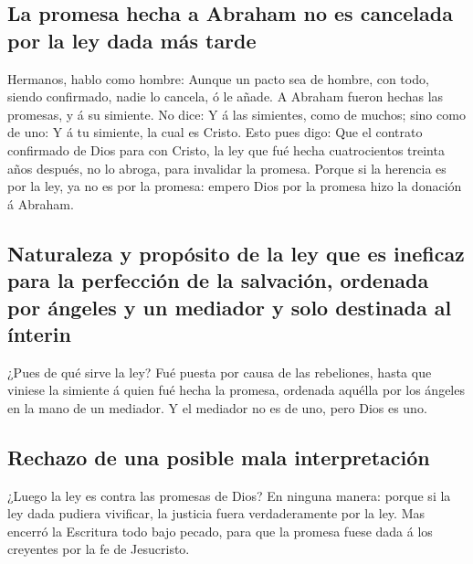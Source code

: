 \hypertarget{la-promesa-hecha-a-abraham-no-es-cancelada-por-la-ley-dada-muxe1s-tarde}{%
\subsection{La promesa hecha a Abraham no es cancelada por la ley dada
más
tarde}\label{la-promesa-hecha-a-abraham-no-es-cancelada-por-la-ley-dada-muxe1s-tarde}}

 Hermanos, hablo como hombre: Aunque un pacto sea de
hombre, con todo, siendo confirmado, nadie lo cancela, ó le añade.
 A Abraham fueron hechas las promesas, y á su simiente. No
dice: Y á las simientes, como de muchos; sino como de uno: Y á tu
simiente, la cual es Cristo.  Esto pues digo: Que el
contrato confirmado de Dios para con Cristo, la ley que fué hecha
cuatrocientos treinta años después, no lo abroga, para invalidar la
promesa.  Porque si la herencia es por la ley, ya no es por
la promesa: empero Dios por la promesa hizo la donación á Abraham.

\hypertarget{naturaleza-y-propuxf3sito-de-la-ley-que-es-ineficaz-para-la-perfecciuxf3n-de-la-salvaciuxf3n-ordenada-por-uxe1ngeles-y-un-mediador-y-solo-destinada-al-uxednterin}{%
\subsection{Naturaleza y propósito de la ley que es ineficaz para la
perfección de la salvación, ordenada por ángeles y un mediador y solo
destinada al
ínterin}\label{naturaleza-y-propuxf3sito-de-la-ley-que-es-ineficaz-para-la-perfecciuxf3n-de-la-salvaciuxf3n-ordenada-por-uxe1ngeles-y-un-mediador-y-solo-destinada-al-uxednterin}}

 ¿Pues de qué sirve la ley? Fué puesta por causa de las
rebeliones, hasta que viniese la simiente á quien fué hecha la promesa,
ordenada aquélla por los ángeles en la mano de un mediador.
 Y el mediador no es de uno, pero Dios es uno.

\hypertarget{rechazo-de-una-posible-mala-interpretaciuxf3n}{%
\subsection{Rechazo de una posible mala
interpretación}\label{rechazo-de-una-posible-mala-interpretaciuxf3n}}

 ¿Luego la ley es contra las promesas de Dios? En ninguna
manera: porque si la ley dada pudiera vivificar, la justicia fuera
verdaderamente por la ley.  Mas encerró la Escritura todo
bajo pecado, para que la promesa fuese dada á los creyentes por la fe de
Jesucristo.


